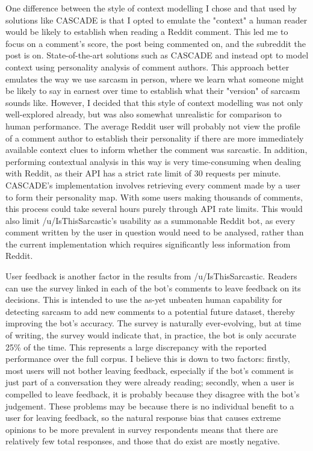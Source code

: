 \documentclass[a4paper,12pt]{article}
\begin{document}
One difference between the style of context modelling I chose and that used by solutions like CASCADE \cite{hazarikaCASCADEContextualSarcasm2018} is that I opted to emulate the "context" a human reader would be likely to establish when reading a Reddit comment. This led me to focus on a comment's score, the post being commented on, and the subreddit the post is on. State-of-the-art solutions such as CASCADE and \cite{poriaDeeperLookSarcastic2017} instead opt to model context using personality analysis of comment authors. This approach better emulates the way we use sarcasm in person, where we learn what someone might be likely to say in earnest over time to establish what their "version" of sarcasm sounds like. However, I decided that this style of context modelling was not only well-explored already, but was also somewhat unrealistic for comparison to human performance. The average Reddit user will probably not view the profile of a comment author to establish their personality if there are more immediately available context clues to inform whether the comment was sarcastic. In addition, performing contextual analysis in this way is very time-consuming when dealing with Reddit, as their API has a strict rate limit of 30 requests per minute. CASCADE's implementation involves retrieving every comment made by a user to form their personality map. With some users making thousands of comments, this process could take several hours purely through API rate limits. This would also limit /u/IsThisSarcastic's usability as a summonable Reddit bot, as every comment written by the user in question would need to be analysed, rather than the current implementation which requires significantly less information from Reddit.

User feedback is another factor in the results from /u/IsThisSarcastic. Readers can use the survey linked in each of the bot's comments to leave feedback on its decisions. This is intended to use the as-yet unbeaten human capability for detecting sarcasm to add new comments to a potential future dataset, thereby improving the bot's accuracy. The survey is naturally ever-evolving, but at time of writing, the survey would indicate that, in practice, the bot is only accurate 25\% of the time. This represents a large discrepancy with the reported performance over the full corpus. I believe this is down to two factors: firstly, most users will not bother leaving feedback, especially if the bot's comment is just part of a conversation they were already reading; secondly, when a user is compelled to leave feedback, it is probably because they disagree with the bot's judgement. These problems may be because there is no individual benefit to a user for leaving feedback, so the natural response bias that causes extreme opinions to be more prevalent in survey respondents means that there are relatively few total responses, and those that do exist are mostly negative.
\end{document}
